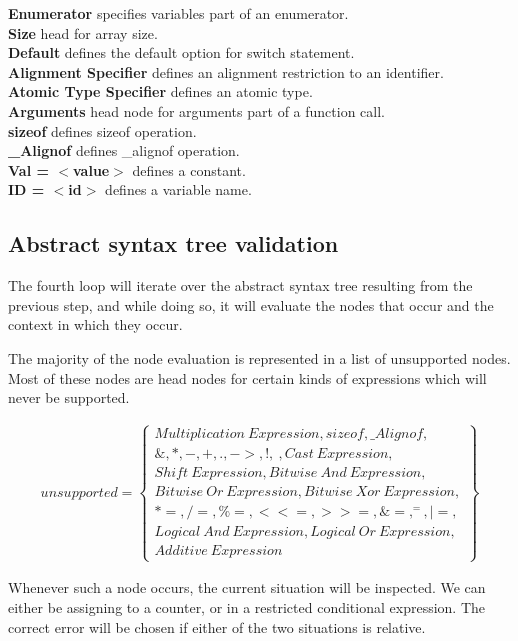 \documentclass[12pt]{article}
\begin{document}
\begin{multicols}{2}
	\textbf{Enumerator} specifies variables part of an enumerator.\\
	\textbf{Size} head for array size.\\
	\textbf{Default} defines the default option for switch statement.\\
	\textbf{Alignment Specifier} defines an alignment restriction to an identifier.\\
	\textbf{Atomic Type Specifier} defines an atomic type.\\
	\textbf{Arguments} head node for arguments part of a function call.\\
	\textbf{sizeof} defines sizeof operation.\\
	\textbf{\_Alignof} defines \_alignof operation.\\
	\textbf{Val = $<$value$>$} defines a constant. \\
	\textbf{ID = $<$id$>$} defines a variable name.
\end{multicols}

\subsection{Abstract syntax tree validation}
The fourth loop will iterate over the abstract syntax tree resulting from the previous step, and while doing so, it will evaluate the nodes that occur and the context in which they occur.

The majority of the node evaluation is represented in a list of unsupported nodes. Most of these nodes are head nodes for certain kinds of expressions which will never be supported.

\begin{align*}
	unsupported = \left\{ \begin{array}{l}
		Multiplication\ Expression, sizeof, \_Alignof, \\
		\&, *, -, +, ., ->, !, ~, Cast\ Expression, \\
		Shift\ Expression, Bitwise\ And\ Expression, \\
		Bitwise\ Or\ Expression, Bitwise\ Xor\ Expression, \\
		*=, /=, \%=, <<=, >>=, \&=, ^=, |=, \\
		Logical\ And\ Expression, Logical\ Or\ Expression, \\
		Additive\ Expression
	\end{array} \right\}
\end{align*}

Whenever such a node occurs, the current situation will be inspected. We can either be assigning to a counter, or in a restricted conditional expression. The correct error will be chosen if either of the two situations is relative.
\end{document}
